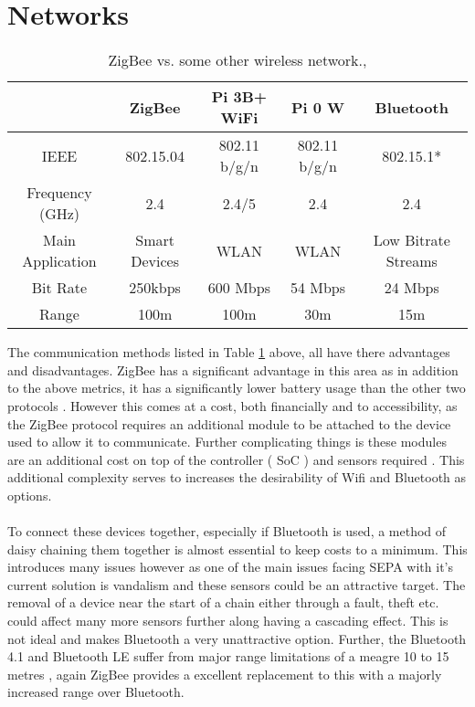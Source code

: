 \section{Networks}

\begin{table}[H]
	\hspace{-1cm}
	\begin{tabular}{ccccc}
		\hline
		{} & ZigBee & Pi 3B+ WiFi & Pi 0 W & Bluetooth \\
		\hline
		IEEE & 802.15.04 & 802.11 b/g/n & 802.11 b/g/n & 802.15.1* \\
		Frequency (GHz) & 2.4 & 2.4/5 & 2.4 & 2.4 \\
		Main Application & Smart Devices & WLAN & WLAN & Low Bitrate Streams \\
		Bit Rate & 250kbps & 600 Mbps & 54 Mbps & 24 Mbps \\
		Range & 100m & 100m & 30m & 15m \\
		\hline 
	\end{tabular}
	\caption{ ZigBee vs. some other wireless network.\citep{RaspberryPiFoundation2018}, \citep{RaspberryPiFoundation2017} }
	\label{fig:networkcompare}
\end{table}


The communication methods listed in Table \ref{fig:networkcompare} above, all have there advantages and disadvantages. ZigBee has a significant advantage in this area as in addition to the above metrics, it has a significantly lower battery usage than the other two protocols \citep{Leccese2014}. However this comes at a cost, both financially and to accessibility, as the ZigBee protocol requires an additional module to be attached to the device used to allow it to communicate. Further complicating things is these modules are an additional cost on top of the controller ( SoC ) and sensors required \citep{zigbee2015}. This additional complexity serves to increases the desirability of Wifi and Bluetooth as options. 
\\\\
To connect these devices together, especially if Bluetooth is used, a method of daisy chaining them together is almost essential to keep costs to a minimum. This introduces many issues however as one of the main issues facing SEPA with it's current solution is vandalism \citep{SEPA2018} and these sensors could be an attractive target. The removal of a device near the start of a chain either through a fault, theft etc. could affect many more sensors further along having a cascading effect. This is not ideal and makes Bluetooth a very unattractive option. Further, the Bluetooth 4.1 and Bluetooth LE suffer from major range limitations of a meagre 10 to 15 metres \citep{Volume2013}, again ZigBee provides a excellent replacement to this with a majorly increased range over Bluetooth. \citep{Pocero2017}

